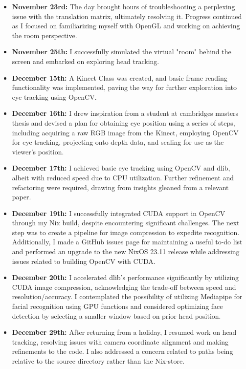 \begin{itemize}
    \item \textbf{November 23rd:} The day brought hours of troubleshooting a perplexing issue with the translation matrix, ultimately resolving it. Progress continued as I focused on familiarizing myself with OpenGL and working on achieving the room perspective.

    \item \textbf{November 25th:} I successfully simulated the virtual "room" behind the screen and embarked on exploring head tracking.

    \item \textbf{December 15th:} A Kinect Class was created, and basic frame reading functionality was implemented, paving the way for further exploration into eye tracking using OpenCV.

    \item \textbf{December 16th:} I drew inspiration from a student at cambridges masters thesis \cite{Zabarauskas2012} and devised a plan for obtaining eye position using a series of steps, including acquiring a raw RGB image from the Kinect, employing OpenCV for eye tracking, projecting onto depth data, and scaling for use as the viewer's position.

    \item \textbf{December 17th:} I achieved basic eye tracking using OpenCV and dlib, albeit with reduced speed due to CPU utilization. Further refinement and refactoring were required, drawing from insights gleaned from a relevant paper.

    \item \textbf{December 19th:} I successfully integrated CUDA support in OpenCV through my Nix build, despite encountering significant challenges. The next step was to create a pipeline for image compression to expedite recognition. Additionally, I made a GitHub issues page for maintaining a useful to-do list and performed an upgrade to the new NixOS 23.11 release while addressing issues related to building OpenCV with CUDA.

    \item \textbf{December 20th:} I accelerated dlib's performance significantly by utilizing CUDA image compression, acknowledging the trade-off between speed and resolution/accuracy. I contemplated the possibility of utilizing Mediapipe for facial recognition using GPU functions and considered optimizing face detection by selecting a smaller window based on prior head position.

    \item \textbf{December 29th:} After returning from a holiday, I resumed work on head tracking, resolving issues with camera coordinate alignment and making refinements to the code. I also addressed a concern related to paths being relative to the source directory rather than the Nix-store.


\end{itemize}
